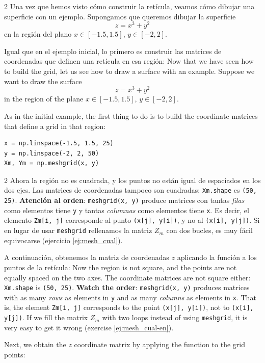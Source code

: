 \begin{paracol}{2}
Una vez que hemos visto cómo construir la retícula, veamos cómo dibujar una superficie con un ejemplo. Supongamos que queremos dibujar la superficie
\begin{equation*}
z=x^3+y^2
\end{equation*}
en la región del plano $x\in[-1.5,1.5]$, $y\in[-2,2]$.

Igual que en el ejemplo inicial, lo primero es construir las matrices de coordenadas que definen una retícula en esa región:
\switchcolumn
Now that we have seen how to build the grid, let us see how to draw a surface with an example. Suppose we want to draw the surface
\begin{equation*}
z=x^3+y^2
\end{equation*}
in the region of the plane $x\in[-1.5,1.5]$, $y\in[-2,2]$.

As in the initial example, the first thing to do is to build the coordinate matrices that define a grid in that region:
\end{paracol}
\begin{verbatim}
x = np.linspace(-1.5, 1.5, 25)
y = np.linspace(-2, 2, 50)
Xm, Ym = np.meshgrid(x, y)
\end{verbatim}
\begin{paracol}{2}
Ahora la región no es cuadrada, y los puntos no están igual de espaciados en los dos ejes. Las matrices de coordenadas tampoco son cuadradas: \texttt{Xm.shape} es \texttt{(50, 25)}. \textbf{Atención al orden}: \texttt{meshgrid(x, y)} produce matrices con tantas \emph{filas} como elementos tiene \texttt{y} y tantas \emph{columnas} como elementos tiene \texttt{x}. Es decir, el elemento \texttt{Zm[i, j]} corresponde al punto \texttt{(x[j], y[i])}, y no al \texttt{(x[i], y[j])}. Si en lugar de usar \texttt{meshgrid} rellenamos la matriz $Z_m$ con dos bucles, es muy fácil equivocarse (ejercicio \ref{ej:mesh_cual}).

A continuación, obtenemos la matriz de coordenadas $z$ aplicando la función a los puntos de la retícula:
\switchcolumn
Now the region is not square, and the points are not equally spaced on the two axes. The coordinate matrices are not square either: \texttt{Xm.shape} is \texttt{(50, 25)}. \textbf{Watch the order}: \texttt{meshgrid(x, y)} produces matrices with as many \emph{rows} as elements in \texttt{y} and as many \emph{columns} as elements in \texttt{x}. That is, the element \texttt{Zm[i, j]} corresponds to the point \texttt{(x[j], y[i])}, not to \texttt{(x[i], y[j])}. If we fill the matrix $Z_m$ with two loops instead of using \texttt{meshgrid}, it is very easy to get it wrong (exercise \ref{ej:mesh_cual-en}).

Next, we obtain the $z$ coordinate matrix by applying the function to the grid points:
\end{paracol}
